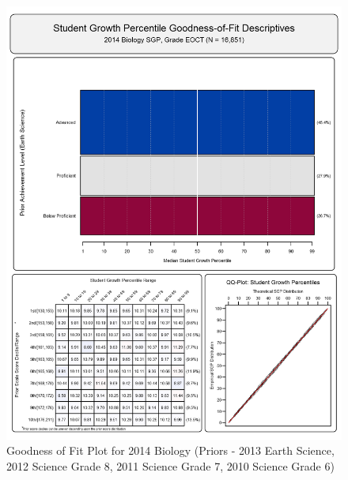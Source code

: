 \documentclass[12pt]{article}
\begin{document}
\begin{figure}[htbp]
\centering
\includegraphics{../img/Goodness_of_Fit/BIOLOGY.2014/2014_BIOLOGY_EOCT;2013_EARTH_SCIENCE_EOCT;2012_SCIENCE_8;2011_SCIENCE_7;2010_SCIENCE_6.png}
\caption{Goodness of Fit Plot for 2014 Biology (Priors - 2013 Earth
Science, 2012 Science Grade 8, 2011 Science Grade 7, 2010 Science Grade
6)}
\end{figure}
\end{document}
